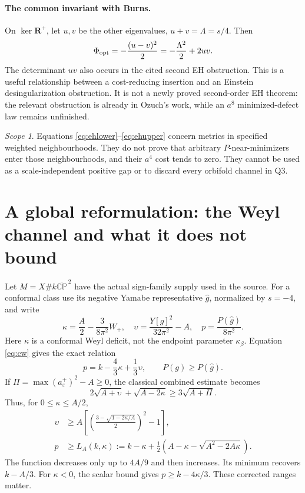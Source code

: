 \documentclass[11pt]{article}
\newcommand{\CP}{\mathbb{CP}}
\newcommand{\Rplus}{\mathbf R^+}
\theoremstyle{remark}
\newtheorem*{scope}{Scope}
\begin{document}
\paragraph{The common invariant with Burns.}
On $\ker\Rplus$, let $u,v$ be the other eigenvalues, $u+v=\Lambda=s/4$.
Then
\[
 \Phi_{\rm opt}=-\frac{(u-v)^2}{2}
              =-\frac{\Lambda^2}{2}+2uv.
\]
The determinant $uv$ also occurs in the cited second EH obstruction.
This is a useful relationship between a cost-reducing insertion and an
Einstein desingularization obstruction. It is not a newly proved
second-order EH theorem: the relevant obstruction is already in Ozuch's
work, while an $a^8$ minimized-defect law remains unfinished.

\begin{scope}
Equations \eqref{eq:ehlower}--\eqref{eq:ehupper} concern metrics in specified
weighted neighbourhoods. They do not prove that arbitrary $P$-near-minimizers
enter those neighbourhoods, and their $a^4$ cost tends to zero. They cannot
be used as a scale-independent positive gap or to discard every orbifold
channel in Q3.
\end{scope}

\section{A global reformulation: the Weyl channel and what it does not bound}
\label{sec:weyl}

Let $M=X\#k\overline{\CP}^{\,2}$ have the actual sign-family supply used
in the source. For a conformal class use its negative Yamabe representative
$\widehat g$, normalized by $s=-4$, and write
\[
 \kappa=\frac A2-\frac3{8\pi^2}W_+,\quad
 \upsilon=\frac{Y[g]^2}{32\pi^2}-A,\quad
 p=\frac{P(\widehat g)}{8\pi^2}.
\]
Here $\kappa$ is a conformal Weyl deficit, not the endpoint parameter
$\kappa_\beta$. Equation \eqref{eq:cw} gives the exact relation
\begin{equation}
 p=k-\frac43\kappa+\frac13\upsilon,
 \qquad P(g)\ge P(\widehat g).\label{eq:channel}
\end{equation}
If $\Pi=\max(a_\varepsilon^+)^2-A\ge0$, the classical combined estimate
becomes
\begin{equation}
 2\sqrt{A+\upsilon}+\sqrt{A-2\kappa}
 \ge3\sqrt{A+\Pi}.\label{eq:lebrun}
\end{equation}
Thus, for $0\le\kappa\le A/2$,
\begin{align}
 \upsilon&\ge A\left[\left(\frac{3-\sqrt{1-2\kappa/A}}2\right)^2-1\right],\\
 p&\ge L_A(k,\kappa)
 :=k-\kappa+\frac12\left(A-\kappa-\sqrt{A^2-2A\kappa}\right).
 \label{eq:L}
\end{align}
The function decreases only up to $4A/9$ and then increases. Its minimum
recovers $k-A/3$. For $\kappa<0$, the scalar bound gives
$p\ge k-4\kappa/3$. These corrected ranges matter.
\end{document}
